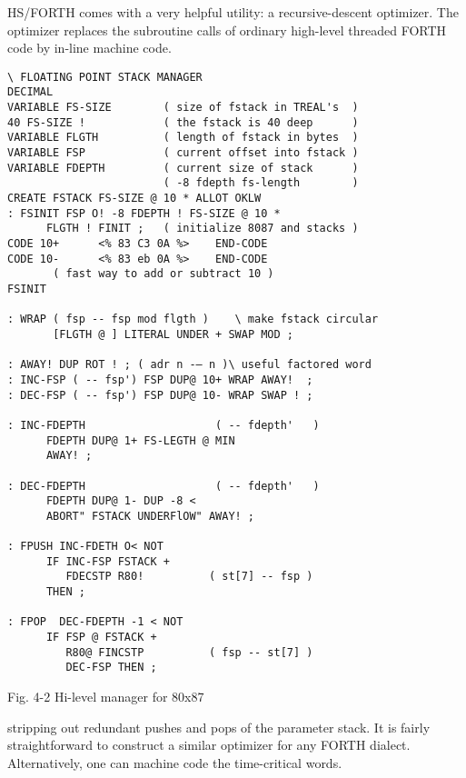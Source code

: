HS/FORTH comes with a very helpful utility: a recursive-descent optimizer. The optimizer replaces the subroutine calls of ordinary high-level threaded FORTH code by in-line machine code.

\begin{lstlisting}[frame=single, float]
\ FLOATING POINT STACK MANAGER
DECIMAL
VARIABLE FS-SIZE        ( size of fstack in TREAL's  ) 
40 FS-SIZE !            ( the fstack is 40 deep      )
VARIABLE FLGTH          ( length of fstack in bytes  )
VARIABLE FSP            ( current offset into fstack )
VARIABLE FDEPTH         ( current size of stack      )
                        ( -8 fdepth fs-length        )
CREATE FSTACK FS-SIZE @ 10 * ALLOT OKLW
: FSINIT FSP O! -8 FDEPTH ! FS-SIZE @ 10 *
      FLGTH ! FINIT ;   ( initialize 8087 and stacks )
CODE 10+      <% 83 C3 0A %>    END-CODE
CODE 10-      <% 83 eb 0A %>    END-CODE
       ( fast way to add or subtract 10 )
FSINIT

: WRAP ( fsp -- fsp mod flgth )    \ make fstack circular
       [FLGTH @ ] LITERAL UNDER + SWAP MOD ;

: AWAY! DUP ROT ! ; ( adr n -— n )\ useful factored word
: INC-FSP ( -- fsp') FSP DUP@ 10+ WRAP AWAY!  ;
: DEC-FSP ( -- fsp') FSP DUP@ 10- WRAP SWAP ! ;

: INC-FDEPTH                    ( -- fdepth'   )
      FDEPTH DUP@ 1+ FS-LEGTH @ MIN
      AWAY! ;

: DEC-FDEPTH                    ( -- fdepth'   )
      FDEPTH DUP@ 1- DUP -8 <
      ABORT" FSTACK UNDERFlOW" AWAY! ;

: FPUSH INC-FDETH O< NOT
      IF INC-FSP FSTACK +
         FDECSTP R80!          ( st[7] -- fsp )
      THEN ;

: FPOP  DEC-FDEPTH -1 < NOT
      IF FSP @ FSTACK +
         R80@ FINCSTP          ( fsp -- st[7] )
         DEC-FSP THEN ;
\end{lstlisting}
Fig. 4-2 Hi-level manager for 80x87

stripping out redundant pushes and pops of the parameter stack. It is fairly straightforward to construct a similar optimizer for any FORTH dialect. Alternatively, one can machine code the time-critical words.

